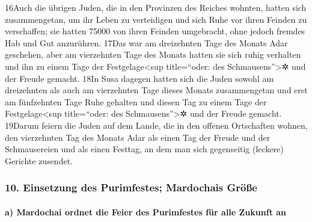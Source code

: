 16Auch die übrigen Juden, die in den Provinzen des Reiches wohnten,
hatten sich zusammengetan, um ihr Leben zu verteidigen und sich Ruhe vor
ihren Feinden zu verschaffen; sie hatten 75000 von ihren Feinden
umgebracht, ohne jedoch fremdes Hab und Gut anzurühren. 17Das war am
dreizehnten Tage des Monats Adar geschehen, aber am vierzehnten Tage des
Monats hatten sie sich ruhig verhalten und ihn zu einem Tage der
Festgelage\textless sup title=``oder: des Schmausens''\textgreater✲ und
der Freude gemacht. 18In Susa dagegen hatten sich die Juden sowohl am
dreizehnten als auch am vierzehnten Tage dieses Monats zusammengetan und
erst am fünfzehnten Tage Ruhe gehalten und diesen Tag zu einem Tage der
Festgelage\textless sup title=``oder: des Schmausens''\textgreater✲ und
der Freude gemacht. 19Darum feiern die Juden auf dem Lande, die in den
offenen Ortschaften wohnen, den vierzehnten Tag des Monats Adar als
einen Tag der Freude und der Schmausereien und als einen Festtag, an dem
man sich gegenseitig (leckere) Gerichte zusendet.

\hypertarget{einsetzung-des-purimfestes-mardochais-gruxf6uxdfe}{%
\subsubsection{10. Einsetzung des Purimfestes; Mardochais
Größe}\label{einsetzung-des-purimfestes-mardochais-gruxf6uxdfe}}

\hypertarget{a-mardochai-ordnet-die-feier-des-purimfestes-fuxfcr-alle-zukunft-an}{%
\paragraph{a) Mardochai ordnet die Feier des Purimfestes für alle
Zukunft
an}\label{a-mardochai-ordnet-die-feier-des-purimfestes-fuxfcr-alle-zukunft-an}}

